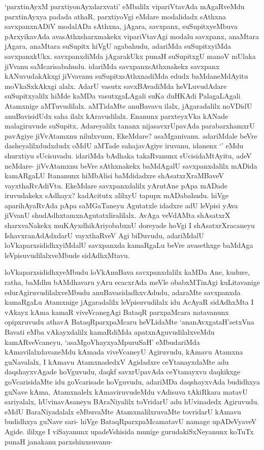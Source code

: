 \begin{artha}
`parxtinAyxM parxtiyonAyxdarxvati' eMbalilx vipariVtavAda mAgaRveMdu parxtinAyxya padada athaR, parxtiyoVgi eMdare modalidadx sAthxna savxpanxnADiV modalADa sAthxna, jAgara, savxpanx, suSupitxyeMbuva pArxyikavAda avasAthxsharxmakekx vipariVtavAgi modalu savxpanx, anaMtara jAgara, anaMtara suSupitx hiVgU agabahudu, adariMda suSupitxyiMda savxpanxkUkx. savxpanxdiMda jAgarakUkx punaH suSupitxgU manoV mUlaka jiVvanu saMcarisabahudu. idariMda savxpanxsAthxnakekx savxpanx kANuvudakAkxgi jiVvavanu suSupitxsAthxnadiMda edudx baMdaneMdAyitu moVkaSxkAkxgi alalx. AdarU vasutx savxBAvadiMda heVLuvudAdare suSupitxyalilx hiMde kaMDa vasutxgaLAgali suKa duHKAdi PalagaLAgali Atamxnige aMTuvudilalx. aMTidaMte anuBavavu ilalx, jAgaradalilx noVDidU anuBavisidUdx saha ilalx kAravudilalx. Enanunx parxteyxVka kANade malagiruvude suSupitx, Adareyalilx tananx nijasavxrUpavAda parabarxhamxrU pavAgiye jiVvAtamxnu nilulxvunu, EkeMdare? asaMganivanu. adariMdale beVre dasheyalilxdudxdudx oMdU aMTade sahajavAgiye iruvanu, idanenx `\stext ' eMdu shurxtiyu sUcisuvadu. idariMda bAdhaka takaRvanunx sUcisidaMtAyitu, adeV neMdare- jiVvAtamxnu beVre sAthxnakekx baMdAgalU savxpanxdalilx mADida kamARgaLU Itananunx hiMbAlisi baMdidadxre shAsatxrXraMBaveV vayxthaRvAdiVtu. EkeMdare savxpanxdalilx yArutAne pApa mADade iruvudakekx sAdhayx? kadAcitutx alilxyU tapupx mADabahudu. hiVge aparihAyaRvAda pApa saMGaTaneyu Agutatxle idadxre adU leVpisi yAva jiVvanU shudAdhxtamxnAgutatxliralilalx. AvAga veVdAMta shAsatxrX sharxvaNakekx muKAyxdhikAriyobabxnU doreyade hoVgi I shAsatxrXracaneyu IshavxranAdAdxdarU vayxthaRveV Agi biDuvudu, adariMdalU loVkaparxsididhxyiMdalU savxpanxda kamaRgaLu beVre avasethxge baMdAga leVpisuvudilalxveMbude sidAdhxMtavu.
\end{artha}%

\begin{artha}
loVkaparxsididhxyeMbudu loVkAnuBava savxpanxdalilx kaMDa Ane, kudure, ratha, baMdhu bAMdhavaru yAru ecacxrAda meVle obabxMTinAgi kuLitavanige edurAgiruvudilalxveMbudu anuBavasidadhxvAdudu, adaraMte savxpanxda kamaRgaLu Atamxnige jAgaradalilx leVpisuvudilalx idu AcAyaR sidAdhxMta I vAkayx kAma kamaR viveVcanegAgi BataqR parxpaMcara natavanunx opipxruvudu athavA BataqRparxpaMcaru heVLidaMte `ananAvxgataH'setxVna Bavati eMba vAkayxdalilx kamaRdiMda apatxnAguvudilalxveMdu kamARveVcaneyu, `asaMgoVhayxyaMpuruSaH' eMbudariMda kAmavilalxdavaneMdu kAmada viveVcaneyU Agiruvudu, kAmavu Atamxna guNavalalx, I kAmavu AtamxnadedxV Agidadxre ceYtanayxdaMte adu daqshayxvAgade hoVguvudu, daqkf savxrUpavAda ceYtanayxvu daqkikxge goVcarisidaMte idu goVcarisade hoVguvudu, adariMDa daqshayxvAda budidhxya guNave kAma, Atamxnalelx kAmaviruvudeMdu vAdisuva tAkiRkara matavU sariyalalx, hUvinavAsaneyu BAraNiyalilx toVridarU adu hUvinadedx Agiruvudu. eMdU BaraNiyadalalx eMbuvaMte AtamxnalilxruvaMte tovridarU kAmavu budidhxya guNave sari- hiVge BataqRparxpaMcamatavU namage upADeVyaveV Agide. ililxge I viSayanunx upadeVshisida munige gurudakiSxNeyanunx koTuTx punaH janakanu parxshinxsuvanu-
\end{artha}%

